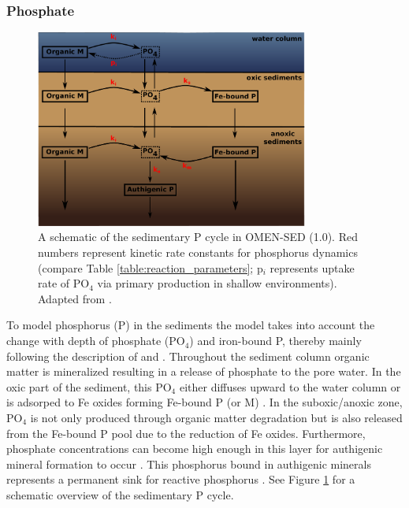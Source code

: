 \documentclass[gmd, manuscript]{copernicus}
\begin{document}
\subsubsection{Phosphate}
\begin{figure}[htbp]
\begin{center}
	\includegraphics[width=0.8\textwidth]{figures/P-cycle.pdf}
	\caption{A schematic of the sedimentary P cycle in OMEN-SED (1.0). Red numbers represent kinetic rate constants for phosphorus dynamics (compare Table \ref{table:reaction_parameters}; p$_i$ represents uptake rate of PO$_4$ 
	via primary production in shallow environments). Adapted from \citet{caroline_p_slomp_key_1996}.}
	\label{fig:P-cycle}
	\end{center}
\end{figure}
To model phosphorus (P) in the sediments the model takes into account the change with depth of phosphate (PO$_4$) and iron-bound P, thereby mainly following the description of \citet{caroline_p_slomp_key_1996} 
and \citet{gypens_simple_2008}. Throughout the sediment column organic matter is mineralized resulting in a release of phosphate to the pore water. In the oxic part of the sediment, this PO$_4$ either 
diffuses upward to the water column or is adsorped to Fe oxides forming Fe-bound P (or M) \citep{slomp1998role}. In the suboxic/anoxic zone, PO$_4$ is not only produced through organic matter degradation but is 
also released from the Fe-bound P pool due to the reduction of Fe oxides. Furthermore, phosphate concentrations can become high enough in this layer for authigenic mineral formation to occur \citep{cappellen_mathematical_1988}. 
This phosphorus bound in authigenic minerals represents a permanent sink for reactive phosphorus \citep{caroline_p_slomp_key_1996}. See Figure \ref{fig:P-cycle} for a schematic overview of the sedimentary P cycle.
\end{document}

